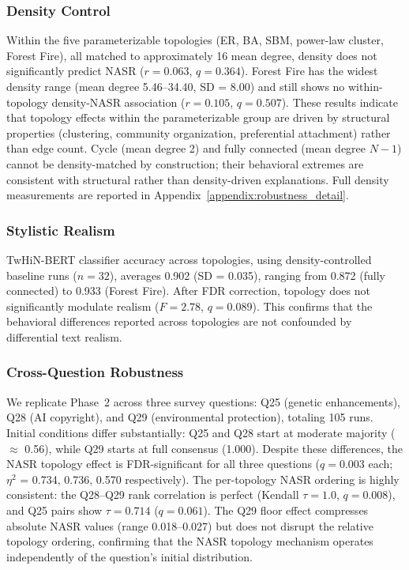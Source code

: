 \documentclass[11pt]{article}
\begin{document}
\subsubsection{Density Control}

Within the five parameterizable topologies (ER, BA, SBM, power-law cluster, Forest Fire), all matched to approximately 16 mean degree, density does not significantly predict NASR ($r = 0.063$, $q = 0.364$). Forest Fire has the widest density range (mean degree 5.46--34.40, SD = 8.00) and still shows no within-topology density-NASR association ($r = 0.105$, $q = 0.507$). These results indicate that topology effects within the parameterizable group are driven by structural properties (clustering, community organization, preferential attachment) rather than edge count. Cycle (mean degree 2) and fully connected (mean degree $N - 1$) cannot be density-matched by construction; their behavioral extremes are consistent with structural rather than density-driven explanations. Full density measurements are reported in Appendix~\ref{appendix:robustness_detail}.

\subsubsection{Stylistic Realism}

TwHiN-BERT classifier accuracy across topologies, using density-controlled baseline runs ($n = 32$), averages 0.902 (SD = 0.035), ranging from 0.872 (fully connected) to 0.933 (Forest Fire). After FDR correction, topology does not significantly modulate realism ($F = 2.78$, $q = 0.089$). This confirms that the behavioral differences reported across topologies are not confounded by differential text realism.

\subsubsection{Cross-Question Robustness}

We replicate Phase~2 across three survey questions: Q25 (genetic enhancements), Q28 (AI copyright), and Q29 (environmental protection), totaling 105 runs. Initial conditions differ substantially: Q25 and Q28 start at moderate majority ($\approx$ 0.56), while Q29 starts at full consensus (1.000). Despite these differences, the NASR topology effect is FDR-significant for all three questions ($q = 0.003$ each; $\eta^2$ = 0.734, 0.736, 0.570 respectively). The per-topology NASR ordering is highly consistent: the Q28--Q29 rank correlation is perfect (Kendall $\tau = 1.0$, $q = 0.008$), and Q25 pairs show $\tau = 0.714$ ($q = 0.061$). The Q29 floor effect compresses absolute NASR values (range 0.018--0.027) but does not disrupt the relative topology ordering, confirming that the NASR topology mechanism operates independently of the question's initial distribution.
\end{document}
